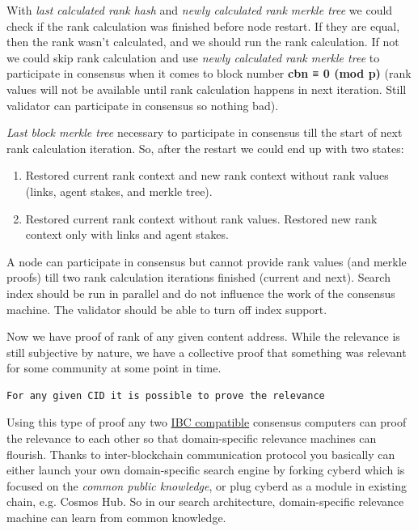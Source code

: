 \documentclass[10pt,oneside]{amsart}
\newcommand{\code}[1]{\textbf{#1}}
\begin{document}
With \textit{last calculated rank hash} and \textit{newly calculated rank merkle tree} we could check if the rank 
calculation was finished before node restart. If they are equal, then the rank wasn't calculated, and we should run the rank calculation.
 If not we could skip rank calculation and use \textit{newly calculated rank merkle tree} to participate in consensus when it comes to block number \code{cbn ≡ 0 (mod p)} (rank values will not be available until rank calculation happens in next iteration. Still validator can participate in consensus so nothing bad).

\textit{Last block merkle tree} necessary to participate in consensus till the start of next rank calculation iteration. So, after the restart we could end up with two states:

\begin{enumerate}
\item Restored current rank context and new rank context without rank values (links, agent stakes, and merkle tree).
\item Restored current rank context without rank values. Restored new rank context only with links and agent stakes.
\end{enumerate}

A node can participate in consensus but cannot provide rank values (and merkle proofs) till two rank calculation iterations finished (current and next). Search index should be run in parallel and do not influence the work of the consensus machine. The validator should be able to turn off index support.

Now we have proof of rank of any given content address. While the relevance is still subjective by nature, we have a collective proof that something was relevant for some community at some point in time.

\begin{lstlisting}
For any given CID it is possible to prove the relevance
\end{lstlisting}

Using this type of proof any two
\href{https://ipfs.io/ipfs/QmdCeixQUHBjGnKfwbB1dxf4X8xnadL8xWmmEnQah5n7x2}{IBC compatible} consensus computers can proof
 the relevance to each other so that domain-specific relevance machines can flourish. Thanks to inter-blockchain communication protocol 
 you basically can either launch your own domain-specific search engine by forking cyberd which is 
 focused on the \textit{common public knowledge}, or plug cyberd as a module in existing chain, e.g. Cosmos Hub. 
 So in our search architecture, domain-specific relevance machine can learn from common knowledge.
\end{document}
